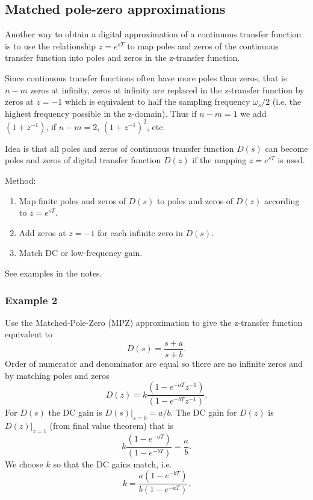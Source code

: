 \subsection*{Matched pole-zero approximations}

Another way to obtain a digital approximation of a continuous transfer function is to use the relationship $z = e^{sT}$ to map poles and zeros of the continuous transfer function into poles and zeros in the z-transfer function. 

Since continuous transfer functions often have more poles than zeros, that is $n-m$ zeros at infinity, zeros at infinity are replaced in the z-transfer function by zeros at $z = -1$ which is equivalent to half the sampling frequency $\omega_s/2$ (i.e. the highest frequency possible in the z-domain). Thus if $n-m =1$ we add $(1+z^{-1})$, if $n-m=2$, $(1+z^{-1})^2$, etc. 

\begin{slide}\label{slides:l11s24}
	Idea is that all poles and zeros of continuous transfer function $D(s)$ can become poles and zeros of digital transfer function $D(z)$ if the mapping $z=e^{sT}$ is used.
	
	Method:
	\begin{enumerate}
		\item Map finite poles and zeros of $D(s)$ to poles and zeros of $D(z)$ according to $z=e^{sT}$.
		\item Add zeros at $z=-1$ for each infinite zero in $D(s)$.
		\item Match DC or low-frequency gain.
	\end{enumerate}
	See examples in the notes.
\end{slide}

\subsubsection*{Example 2}

Use the Matched-Pole-Zero (MPZ) approximation to give the z-transfer function equivalent to
$$D(s)=\frac{s+a}{s+b}.$$ Order of numerator and denominator are equal so there are no infinite zeros and by matching poles and zeros  $$D(z)=k\frac{(1-e^{-aT}z^{-1})}{(1 - e^{-bT}z^{-1})}.$$ For $D(s)$ the DC gain is $D(s)|_{s=0} = a/b$. The DC gain for $D(z)$ is $D(z)|_{z=1}$ (from final value theorem) that is $$k\frac{(1-e^{-aT})}{(1-e^{-bT})} = \frac{a}{b}.$$ We choose $k$ so that the DC gains match, i.e. $$k=\frac{a(1-e^{-bT})}{b(1-e^{-aT})}.$$

